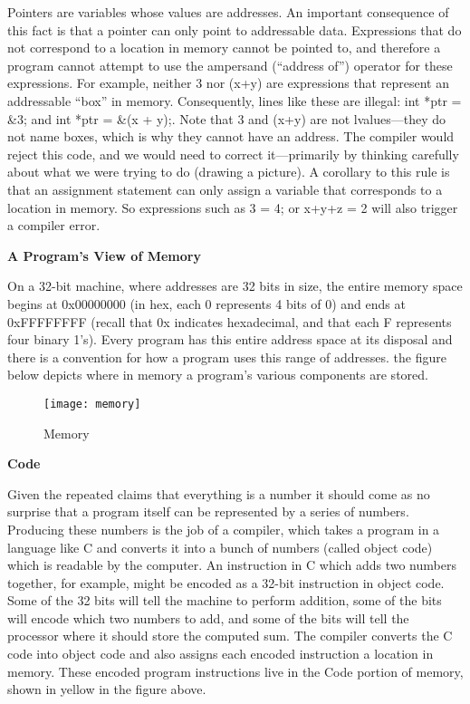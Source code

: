 \documentclass[11pt, a4paper]{article}
\begin{document}
Pointers are variables whose values are addresses. An important consequence of this fact is that a pointer can only point to addressable data. Expressions that do not correspond to a location in memory cannot be pointed to, and therefore a program cannot attempt to use the ampersand (“address of”) operator for these expressions. For example, neither 3 nor (x+y) are expressions that represent an addressable “box” in memory. Consequently, lines like these are illegal: int *ptr = \&3; and int *ptr = \&(x + y);. Note that 3 and (x+y) are not lvalues—they do not name boxes, which is why they cannot have an address. The compiler would reject this code, and we would need to correct it—primarily by thinking carefully about what we were trying to do (drawing a picture). A corollary to this rule is that an assignment statement can only assign a variable that corresponds to a location in memory. So expressions such as 3 = 4; or x+y+z = 2 will also trigger a compiler error.


\textbf{A Program's View of Memory}


On a 32-bit machine, where addresses are 32 bits in size, the entire memory space begins at 0x00000000 (in hex, each 0 represents 4 bits of 0) and ends at 0xFFFFFFFF (recall that 0x indicates hexadecimal, and that each F represents four binary 1’s). Every program has this entire address space at its disposal and there is a convention for how a program uses this range of addresses. the figure below depicts where in memory a program’s various components are stored.




\begin{figure}[htpb]
  \centering
  \texttt{[image: memory]}
  \caption{Memory}
  \label{fig:memory}
\end{figure}

\textbf{Code}

Given the repeated claims that everything is a number it should come as no surprise that a program itself can be represented by a series of numbers. Producing these numbers is the job of a compiler, which takes a program in a language like C and converts it into a bunch of numbers (called object code) which is readable by the computer. An instruction in C which adds two numbers together, for example, might be encoded as a 32-bit instruction in object code. Some of the 32 bits will tell the machine to perform addition, some of the bits will encode which two numbers to add, and some of the bits will tell the processor where it should store the computed sum. The compiler converts the C code into object code and also assigns each encoded instruction a location in memory. These encoded program instructions live in the Code portion of memory, shown in yellow in the figure above.
\end{document}
